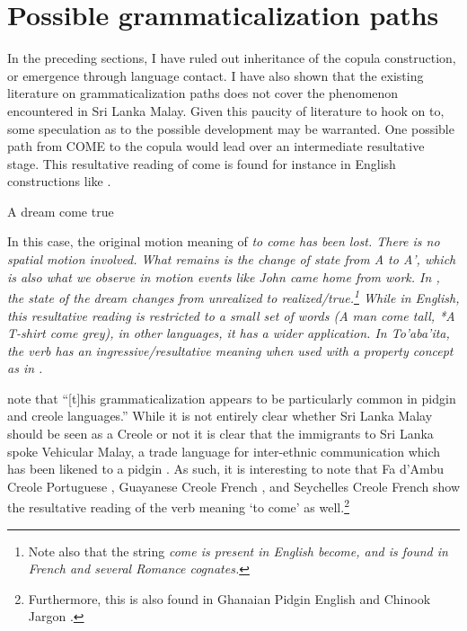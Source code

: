 \documentclass[a4paper,12pt]{article}
\begin{document}
\section{Possible grammaticalization paths}
In the preceding sections, I have ruled out inheritance of the copula construction, or emergence through language contact. I have also shown that the existing literature on grammaticalization paths  does not cover the phenomenon encountered in Sri Lanka Malay. Given this paucity of literature to hook on to, some speculation as to the possible development may be warranted. One possible path from COME to the copula would lead over an intermediate resultative stage. This resultative reading of come is found for instance  in English constructions like .

\ea\label{ex:dream} A dream come true\z

In this case, the original motion meaning of \em to come \em has been lost. There is no spatial motion involved. What remains is the change of state from A to A', which is also what we observe in motion events like \em John came home from work\em. In , the state of the dream changes from unrealized to realized/true.\footnote{Note also that the string \em come \em is present in English \em become\em, and  is found in French  and several Romance cognates.} While in English, this resultative reading is restricted to a small set of words (\em *A man come tall, *A T-shirt come grey\em), in other languages, it has a wider application. In To'aba'ita, the verb  has an ingressive/resultative meaning when used with a property concept as in .


\citet[74]{HeineEtAl2002} note that ``[t]his grammaticalization appears to be particularly common in pidgin and creole languages.'' While it is not entirely clear whether Sri Lanka  Malay should be seen as a Creole \citep{SmithEtAl2006cll} or not \citep{Ansaldo2008genesis,Nordhoff2009phd} it is clear that the immigrants to Sri Lanka spoke Vehicular Malay, a trade language for inter-ethnic communication which has been likened to a pidgin \citep{AdelaarEtAl1996}. As such, it is interesting to note that Fa d'Ambu Creole Portuguese , Guayanese Creole French , and Seychelles Creole French    show the resultative reading of the verb meaning `to come' as well.\footnote{Furthermore, this is also found in Ghanaian Pidgin English \citep{Huber1996} and Chinook Jargon \citep[236]{Grant1996}.}
\end{document}
